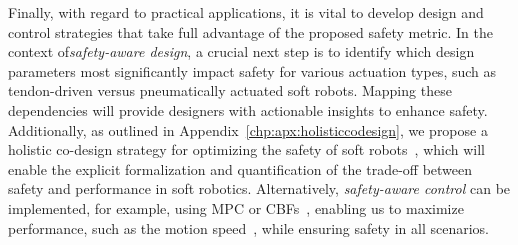 Finally, with regard to practical applications, it is vital to develop design and control strategies that take full advantage of the proposed safety metric. In the context of\emph{safety-aware design}, a crucial next step is to identify which design parameters most significantly impact safety for various actuation types, such as tendon-driven versus pneumatically actuated soft robots. Mapping these dependencies will provide designers with actionable insights to enhance safety. Additionally, as outlined in Appendix~\ref{chp:apx:holisticcodesign}, we propose a holistic co-design strategy for optimizing the safety of soft robots~\citep{zardini2023co, spielberg2019learning, wang2024diffusebot, navez2024contributions}, which will enable the explicit formalization and quantification of the trade-off between safety and performance in soft robotics.
Alternatively, \emph{safety-aware control} can be implemented, for example, using \gls{MPC} or \glspl{CBF}~\citep{ames2016control, ferraguti2020control}, enabling us to maximize performance, such as the motion speed~\citep{haggerty2023control}, while ensuring safety in all scenarios.